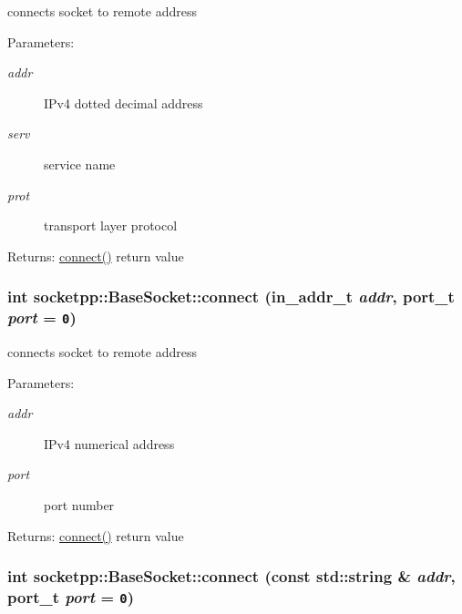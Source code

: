connects socket to remote address 

\begin{Desc}
\item[Parameters:]
\begin{description}
\item[{\em addr}]IPv4 dotted decimal address \item[{\em serv}]service name \item[{\em prot}]transport layer protocol \end{description}
\end{Desc}
\begin{Desc}
\item[Returns:]\hyperlink{classsocketpp_1_1BaseSocket_769710192256606aaec1a776468d75fa}{connect()} return value \end{Desc}
\hypertarget{classsocketpp_1_1BaseSocket_2bdd6d459e6f9cf2f71636b01787b250}{
\subsubsection[{connect}]{\setlength{\rightskip}{0pt plus 5cm}int socketpp::BaseSocket::connect (in\_\-addr\_\-t {\em addr}, \/  {\bf port\_\-t} {\em port} = {\tt 0})}}
\label{classsocketpp_1_1BaseSocket_2bdd6d459e6f9cf2f71636b01787b250}


connects socket to remote address 

\begin{Desc}
\item[Parameters:]
\begin{description}
\item[{\em addr}]IPv4 numerical address \item[{\em port}]port number \end{description}
\end{Desc}
\begin{Desc}
\item[Returns:]\hyperlink{classsocketpp_1_1BaseSocket_769710192256606aaec1a776468d75fa}{connect()} return value \end{Desc}
\hypertarget{classsocketpp_1_1BaseSocket_769710192256606aaec1a776468d75fa}{
\subsubsection[{connect}]{\setlength{\rightskip}{0pt plus 5cm}int socketpp::BaseSocket::connect (const std::string \& {\em addr}, \/  {\bf port\_\-t} {\em port} = {\tt 0})}}
\label{classsocketpp_1_1BaseSocket_769710192256606aaec1a776468d75fa}



